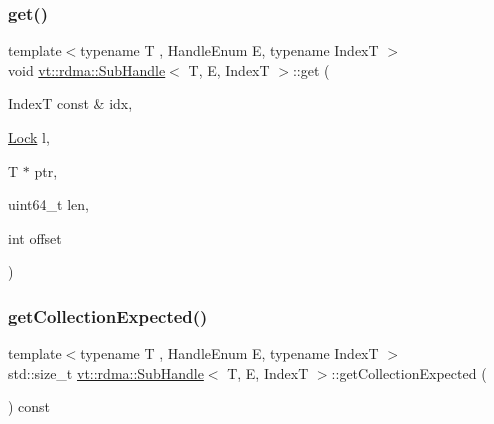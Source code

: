 \subsubsection{\texorpdfstring{get()}{get()}}
{\footnotesize\ttfamily template$<$typename T , Handle\+Enum E, typename IndexT $>$ \\
void \hyperlink{structvt_1_1rdma_1_1_sub_handle}{vt\+::rdma\+::\+Sub\+Handle}$<$ T, E, IndexT $>$\+::get (\begin{DoxyParamCaption}\item[{IndexT const \&}]{idx,  }\item[{\hyperlink{namespacevt_1_1rdma_ac5c20b41a653e520b6305d4d454ecb70}{Lock}}]{l,  }\item[{T $\ast$}]{ptr,  }\item[{uint64\+\_\+t}]{len,  }\item[{int}]{offset }\end{DoxyParamCaption})}

\mbox{\label{structvt_1_1rdma_1_1_sub_handle_ace1b9d5aa44a6c4474ae8ec2e007a2c6}} 
\subsubsection{\texorpdfstring{get\+Collection\+Expected()}{getCollectionExpected()}}
{\footnotesize\ttfamily template$<$typename T , Handle\+Enum E, typename IndexT $>$ \\
std\+::size\+\_\+t \hyperlink{structvt_1_1rdma_1_1_sub_handle}{vt\+::rdma\+::\+Sub\+Handle}$<$ T, E, IndexT $>$\+::get\+Collection\+Expected (\begin{DoxyParamCaption}{ }\end{DoxyParamCaption}) const}

\mbox{\label{structvt_1_1rdma_1_1_sub_handle_a29afd2245c28f7ad1bf7e058b62cfe07}} 
